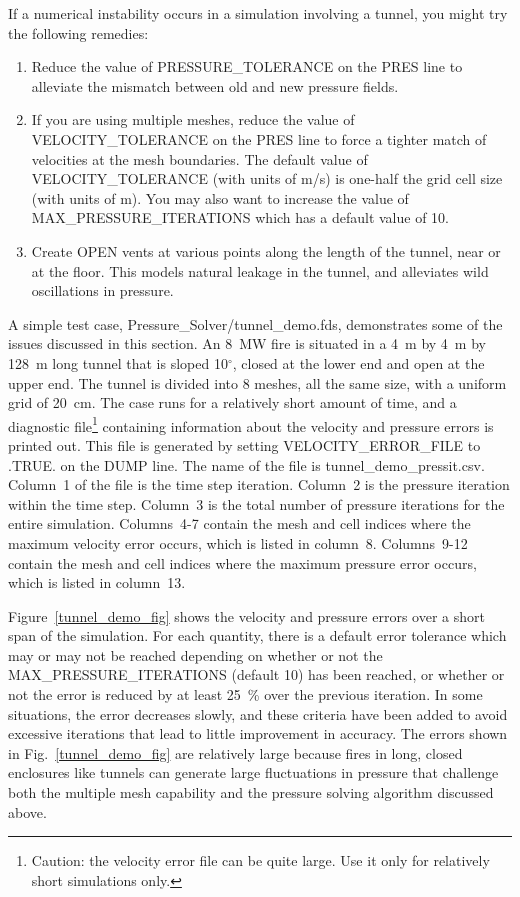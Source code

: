 \documentclass[11pt]{book}
\begin{document}
If a numerical instability occurs in a simulation involving a tunnel, you might try the following remedies:
\begin{enumerate}
\item Reduce the value of {\ct PRESSURE\_TOLERANCE} on the {\ct PRES} line to alleviate the mismatch between old and new pressure fields.
\item If you are using multiple meshes, reduce the value of {\ct VELOCITY\_TOLERANCE} on the {\ct PRES} line to force a tighter match of velocities at the mesh boundaries. The default value of {\ct VELOCITY\_TOLERANCE} (with units of m/s) is one-half the grid cell size (with units of m). You may also want to increase the value of {\ct MAX\_PRESSURE\_ITERATIONS} which has a default value of 10.
\item Create {\ct OPEN} vents at various points along the length of the tunnel, near or at the floor. This models natural leakage in the tunnel, and alleviates wild oscillations in pressure.
\end{enumerate}
A simple test case, {\ct Pressure\_Solver/tunnel\_demo.fds}, demonstrates some of the issues discussed in this section. An 8~MW fire is situated in a 4~m by 4~m by 128~m long tunnel that is sloped 10$^\circ$, closed at the lower end and open at the upper end. The tunnel is divided into 8 meshes, all the same size, with a uniform grid of 20~cm. The case runs for a relatively short amount of time, and a diagnostic file\footnote{Caution: the velocity error file can be quite large. Use it only for relatively short simulations only.} containing information about the velocity and pressure errors is printed out. This file is generated by setting {\ct VELOCITY\_ERROR\_FILE} to {\ct .TRUE.} on the {\ct DUMP} line. The name of the file is {\ct tunnel\_demo\_pressit.csv}. Column~1 of the file is the time step iteration. Column~2 is the pressure iteration within the time step. Column~3 is the total number of pressure iterations for the entire simulation. Columns~4-7 contain the mesh and cell indices where the maximum velocity error occurs, which is listed in column~8. Columns~9-12 contain the mesh and cell indices where the maximum pressure error occurs, which is listed in column~13.

Figure~\ref{tunnel_demo_fig} shows the velocity and pressure errors over a short span of the simulation. For each quantity, there is a default error tolerance which may or may not be reached depending on whether or not the {\ct MAX\_PRESSURE\_ITERATIONS} (default 10) has been reached, or whether or not the error is reduced by at least 25~\% over the previous iteration. In some situations, the error decreases slowly, and these criteria have been added to avoid excessive iterations that lead to little improvement in accuracy. The errors shown in Fig.~\ref{tunnel_demo_fig} are relatively large because fires in long, closed enclosures like tunnels can generate large fluctuations in pressure that challenge both the multiple mesh capability and the pressure solving algorithm discussed above.
\end{document}
